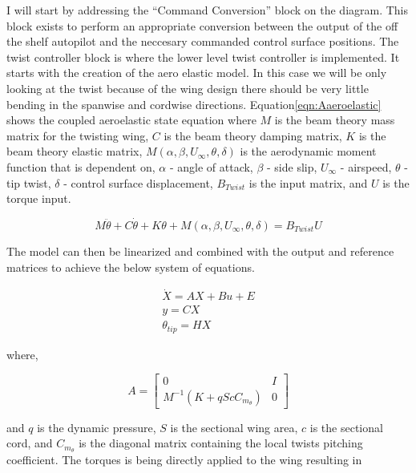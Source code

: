 \documentclass[11pt]{ucthesis}
\begin{document}
I will start by addressing the ``Command Conversion'' block on the diagram. This block exists to perform an appropriate conversion between the output of the off the shelf autopilot and the neccesary commanded control surface positions. The twist controller block is where the lower level twist controller is implemented. It starts with the creation of the aero elastic model. In this case we will be only looking at the twist because of the wing design there should be very little bending in the spanwise and cordwise directions. Equation\ref{eqn:Aaeroelastic} shows the coupled aeroelastic state equation where $M$ is the beam theory mass matrix for the twisting wing, $C$ is the beam theory damping matrix, $K$ is the beam theory elastic matrix, $M(\alpha,\beta,U_{\infty},\theta,\delta)$ is the aerodynamic moment function that is dependent on, $\alpha$ - angle of attack, $\beta$ - side slip, $U_{\infty}$ - airspeed, $\theta$ - tip twist, $\delta$ - control surface displacement, $B_{Twist}$ is the input matrix, and $U$ is the torque input.

\begin{equation}
M \ddot{\theta} + C \dot{\theta} +K\theta+M(\alpha,\beta,U_{\infty},\theta,\delta) = B_{Twist}U
\label{eqn:Aaeroelastic}
\end{equation}

The model can then be linearized and combined with the output and reference matrices to achieve the below system of equations.

\begin{equation}
\begin{matrix}
\dot{X} = AX + Bu+E\\
y = CX\\
\theta_{tip} = HX
\end{matrix}
\label{eqn:Asys}
\end{equation}

where,

\begin{equation}
A = \begin{bmatrix}
0&I\\
M^{-1}(K+qScC_{m_{\theta}})&0
\end{bmatrix}
\end{equation}

and $q$ is the dynamic pressure, $S$ is the sectional wing area, $c$ is the sectional cord, and $C_{m_{\theta}}$ is the diagonal matrix containing the local twists pitching coefficient. The torques is being directly applied to the wing resulting in 
\end{document}
